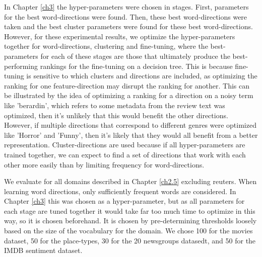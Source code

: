 
In Chapter \ref{ch3} the hyper-parameters were chosen in stages. First, parameters for the best word-directions were found. Then, these best word-directions were taken and the best cluster parameters were found for these  best word-directions. However, for these experimental results, we optimize the hyper-parameters together for word-directions, clustering and fine-tuning, where the best-parameters for each of these stages are those that ultimately produce the best-performing rankings for the fine-tuning on a decision tree.  This is because fine-tuning is sensitive to which clusters and directions are included, as optimizing the ranking for one feature-direction may disrupt the ranking for another. This can be illustrated by the idea of optimizing a ranking for a direction on a noisy term like 'berardin', which refers to some metadata from the review text was optimized, then it's unlikely that this would benefit the other directions. However, if multiple directions that correspond to different genres were optimized like 'Horror' and 'Funny', then it's likely that they would all benefit from a better representation. Cluster-directions are used because if all hyper-parameters are trained together, we can expect to find a set of directions that work with each other more easily than by limiting frequency for word-directions. 

We evaluate for all domains described in Chapter \ref{ch2.5} excluding reuters. When learning word directions, only sufficiently frequent words are considered. In Chapter \ref{ch3} this was chosen as a hyper-parameter, but as all parameters for each stage are tuned together it would take far too much time to optimize in this way, so it  is chosen beforehand. It is chosen by pre-determining thresholds loosely based on the size of the vocabulary for the domain. We chose 100 for the movies dataset,  50 for the place-types, 30 for the 20 newsgroups datasedt, and 50 for the IMDB sentiment dataset. 

